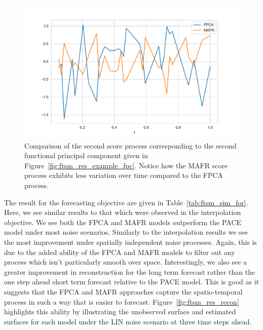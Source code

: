 \begin{figure}[htbp!] 
	\centering    
	\includegraphics[width=1.0\textwidth]{ftsm_res_zeta_example}
	\caption{Comparison of the second score process corresponding to the second functional principal component given in Figure~\ref{fig:ftsm_res_example_fpc}. Notice how the MAFR score process exhibits less variation over time compared to the FPCA process.}
	\label{fig:ftsm_res_example_zeta}
\end{figure}

The result for the forecasting objective are given in Table~\ref{tab:ftsm_sim_for}.
Here, we see similar results to that which were observed in the interpolation objective.
We see both the FPCA and MAFR models outperform the PACE model under most noise scenarios.
Similarly to the interpolation results we see the most improvement under spatially independent noise processes.
Again, this is due to the added ability of the FPCA and MAFR models to filter out any process which isn't particularly smooth over space. 
Interestingly, we also see a greater improvement in reconstruction for the long term forecast rather than the one step ahead short term forecast relative to the PACE model.
This is good as it suggests that the FPCA and MAFR approaches capture the spatio-temporal process in such a way that is easier to forecast. 
Figure~\ref{fig:ftsm_res_recon} highlights this ability by illustrating the unobserved surface and estimated surfaces for each model under the LIN noise scenario at three time steps ahead.

